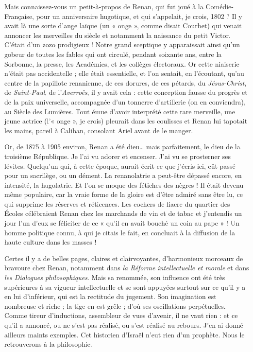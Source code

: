\documentclass[french,twoside]{book} %
\begin{document}
Mais connaissez-vous un petit-à-propos de Renan, qui fut joué à la Comédie-Française, pour un anniversaire hugotique, et qui s’appelait, je crois, 1802 ? Il y avait là une sorte d’ange laïque (un « onge », comme disait Courbet) qui venait annoncer les merveilles du siècle et notamment la naissance du petit Victor. C’était d’un zozo prodigieux ! Notre grand sceptique y apparaissait ainsi qu’un gobeur de toutes les fables qui ont circulé, pendant soixante ans, entre la Sorbonne, la presse, les Académies, et les collèges électoraux. Or cette niaiserie n’était pas accidentelle ; elle était essentielle, et l’on sentait, en l’écoutant, qu’au centre de la papillote renanienne, de ces dorures, de ces pétards, du {\itshape Jésus-Christ}, de {\itshape Saint-Paul}, de l’{\itshape Averroës}, il y avait cela : cette conception fausse du progrès et de la paix universelle, accompagnée d’un tonnerre d’artillerie (on en conviendra), au Siècle des Lumières. Tout émue d’avoir interprété cette rare merveille, une jeune actrice (l’« onge », je crois) pleurait dans les coulisses et Renan lui tapotait les mains, pareil à Caliban, consolant Ariel avant de le manger.\par
Or, de 1875 à 1905 environ, Renan a été dieu… mais parfaitement, le dieu de la troisième République. Je l’ai vu adorer et encenser. J’ai vu se prosterner ses lévites. Quelqu’un qui, à cette époque, aurait écrit ce que j’écris ici, eût passé pour un sacrilège, ou un dément. La renanolatrie a peut-être dépassé encore, en intensité, la hugolatrie. Et l’on se moque des fétiches des nègres ! Il était devenu même populaire, car la vraie forme de la gloire est d’être admiré sans être lu, ce qui supprime les réserves et réticences. Les cochers de fiacre du quartier des Écoles célébraient Renan chez les marchands de vin et de tabac et j’entendis un jour l’un d’eux se féliciter de ce « qu’il en avait bouché un coin au pape » ! Un homme politique connu, à qui je citais le fait, en concluait à la diffusion de la haute culture dans les masses !\par
Certes il y a de belles pages, claires et clairvoyantes, d’harmonieux morceaux de bravoure chez Renan, notamment dans {\itshape la Réforme intellectuelle et morale} et dans {\itshape les Dialogues philosophiques}. Mais sa renommée, son influence ont été très supérieures à sa vigueur intellectuelle et se sont appuyées surtout sur ce qu’il y a en lui d’inférieur, qui est la rectitude du jugement. Son imagination est nombreuse et riche ; la tige en est grêle ; d’où ses oscillations perpétuelles. Comme tireur d’inductions, assembleur de vues d’avenir, il ne vaut rien : et ce qu’il a annoncé, ou ne s’est pas réalisé, ou s’est réalisé au rebours. J’en ai donné ailleurs maints exemples. Cet historien d’Israël n’eut rien d’un prophète. Nous le retrouverons à la philosophie.\par
\end{document}
